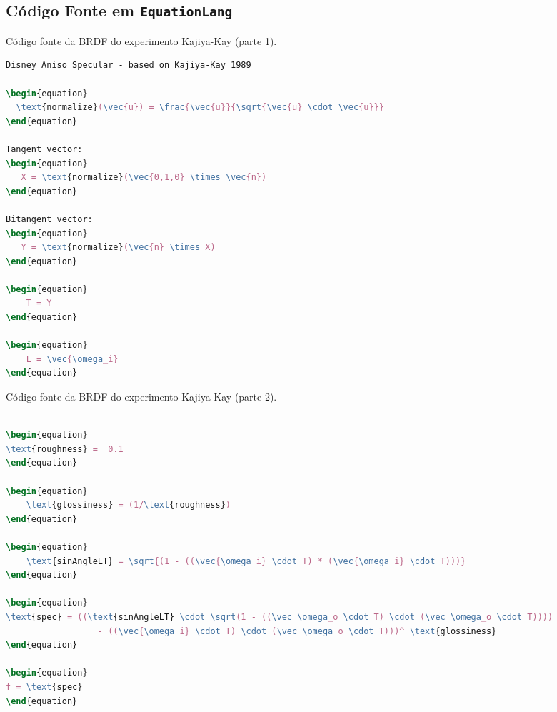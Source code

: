 \subsection{Código Fonte em \texttt{EquationLang}}
\begin{codigo}[H]
    \caption{\small Código fonte da BRDF do experimento Kajiya-Kay (parte 1).}
    \label{cod-kajiya-eqlang}
\begin{lstlisting}[language=tex, frame=none, inputencoding=utf8]
Disney Aniso Specular - based on Kajiya-Kay 1989

\begin{equation}
  \text{normalize}(\vec{u}) = \frac{\vec{u}}{\sqrt{\vec{u} \cdot \vec{u}}}
\end{equation}

Tangent vector:
\begin{equation}
   X = \text{normalize}(\vec{0,1,0} \times \vec{n})
\end{equation}

Bitangent vector:
\begin{equation}
   Y = \text{normalize}(\vec{n} \times X)
\end{equation}

\begin{equation}
    T = Y
\end{equation}

\begin{equation}
    L = \vec{\omega_i}
\end{equation}
\end{lstlisting}
\end{codigo}

\begin{codigo}[H]
    \caption{\small Código fonte da BRDF do experimento Kajiya-Kay (parte 2).}
    \label{cod-kajiya-eqlang-pt2}
\begin{lstlisting}[language=tex, frame=none, inputencoding=utf8]

\begin{equation}
\text{roughness} =  0.1
\end{equation}

\begin{equation}
    \text{glossiness} = (1/\text{roughness})
\end{equation}

\begin{equation}
    \text{sinAngleLT} = \sqrt{(1 - ((\vec{\omega_i} \cdot T) * (\vec{\omega_i} \cdot T)))}
\end{equation}

\begin{equation}
\text{spec} = ((\text{sinAngleLT} \cdot \sqrt(1 - ((\vec \omega_o \cdot T) \cdot (\vec \omega_o \cdot T))))
                  - ((\vec{\omega_i} \cdot T) \cdot (\vec \omega_o \cdot T)))^ \text{glossiness}
\end{equation}

\begin{equation}
f = \text{spec}
\end{equation}
\end{lstlisting}
\end{codigo}
